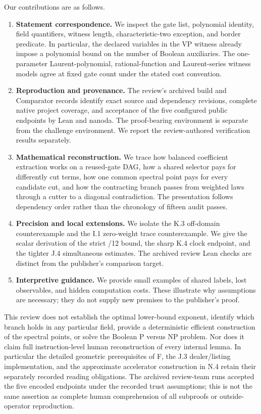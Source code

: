 \documentclass[11pt,letterpaper]{article}
\theoremstyle{definition}\newtheorem{definition}[theorem]{Definition}\newtheorem{example}[theorem]{Example}
\theoremstyle{remark}\newtheorem{remark}[theorem]{Remark}
\begin{document}
Our contributions are as follows.
\begin{enumerate}[leftmargin=1.7em,itemsep=2pt]
\item \textbf{Statement correspondence.} We inspect the gate list, polynomial identity, field quantifiers, witness length, characteristic-two exception, and border predicate. In particular, the declared variables in the VP witness already impose a polynomial bound on the number of Boolean auxiliaries. The one-parameter Laurent-polynomial, rational-function and Laurent-series witness models agree at fixed gate count under the stated cost convention.
\item \textbf{Reproduction and provenance.} The review's archived build and Comparator records identify exact source and dependency revisions, complete native project coverage, and acceptance of the five configured public endpoints by Lean and nanoda. The proof-bearing environment is separate from the challenge environment. We report the review-authored verification results separately.
\item \textbf{Mathematical reconstruction.} We trace how balanced coefficient extraction works on a reused-gate DAG, how a shared selector pays for differently cut terms, how one common spectral point pays for every candidate cut, and how the contracting branch passes from weighted laws through a cutter to a diagonal contradiction. The presentation follows dependency order rather than the chronology of fifteen audit passes.
\item \textbf{Precision and local extensions.} We isolate the K.3 off-domain counterexample and the I.1 zero-weight trace counterexample. We give the scalar derivation of the strict /12 bound, the sharp K.4 clock endpoint, and the tighter J.4 simultaneous estimates. The archived review Lean checks are distinct from the publisher's comparison target.
\item \textbf{Interpretive guidance.} We provide small examples of shared labels, lost observables, and hidden computation costs. These illustrate why assumptions are necessary; they do not supply new premises to the publisher's proof.
\end{enumerate}
This review does not establish the optimal lower-bound exponent, identify which branch holds in any particular field, provide a deterministic efficient construction of the spectral points, or solve the Boolean P versus NP problem. Nor does it claim full instruction-level human reconstruction of every internal lemma. In particular the detailed geometric prerequisites of F, the J.3 dealer/listing implementation, and the approximate accelerator construction in N.4 retain their separately recorded reading obligations. The archived review-team runs accepted the five encoded endpoints under the recorded trust assumptions; this is not the same assertion as complete human comprehension of all subproofs or outside-operator reproduction.
\end{document}
